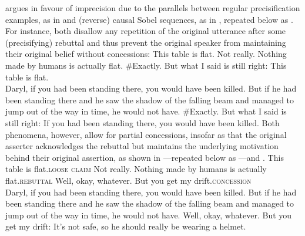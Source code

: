 \textcite{Klecha2014} argues in favour of imprecision due to the parallels between regular precisification examples, as in  and (reverse) causal Sobel sequences, as in , repeated below as . For instance, both disallow any repetition of the original utterance after some (precisifying) rebuttal and thus prevent the original speaker from maintaining their original belief without concessions:%
\pex{}%
\vspace{-2mm}
\a{}This table is flat.
\a{}Not really. Nothing made by humans is actually flat.
\a{}\#Exactly. But what I said is still right: This table is flat.\\
\emptyfill\parencite[adapted from][p. 113]{Klecha2014}
\xe
\pex{}%
			\a	{}Daryl, if you had been standing there, you would have been killed.
			\a	{}But if he had been standing there and he saw the shadow of the falling beam and managed to jump out of the way in time, he would not have.
			\a	{}\#Exactly. But what I said is still right:  If you had been
standing there, you would have been killed.\hfill\parencite[adapted from][p. 153f]{Klecha2014}
\xe
Both phenomena, however, allow for partial concessions, insofar as that the original asserter acknowledges the rebuttal but maintains the underlying motivation behind their original assertion, as shown in ---repeated below as ---and .
\pex{}%
\a{}This table is flat.\hfill{\scshape loose claim}
\a{}Not really. Nothing made by humans is actually flat.\hfill{\scshape rebuttal}
\a{}Well, okay, whatever. But you get my drift.\hfill{\scshape concession}\\
\emptyfill\parencite[p. 113]{Klecha2014}
\xe
\pex{}%
			\a	{}Daryl, if you had been standing there, you would have been killed.
			\a	{}But if he had been standing there and he saw the shadow of the falling beam and managed to jump out of the way in time, he would not have.
			\a	{}Well, okay, whatever. But you get my drift: It's not safe, so he should really be wearing a helmet.
\xe


